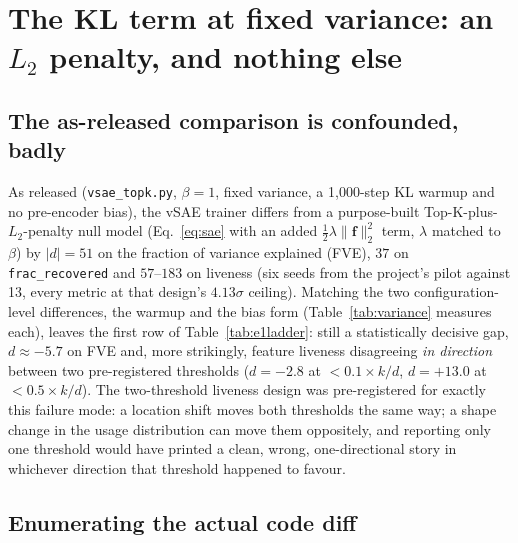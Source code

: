 \documentclass[11pt]{article}
\begin{document}
\section{The KL term at fixed variance: an $L_2$ penalty, and nothing else}
\label{sec:e1}

\subsection{The as-released comparison is confounded, badly}

As released (\texttt{vsae\_topk.py}, $\beta=1$, fixed variance, a 1{,}000-step
KL warmup and no pre-encoder bias), the vSAE trainer differs from a
purpose-built Top-K-plus-$L_2$-penalty null model (Eq.~\ref{eq:sae} with an
added $\tfrac{1}{2}\lambda\|\mathbf{f}\|_2^2$ term, $\lambda$ matched to
$\beta$) by $|d|=51$ on the fraction of variance explained (FVE), $37$ on
\texttt{frac\_recovered} and $57$--$183$ on liveness (six seeds from the
project's pilot against 13, every metric at that design's $4.13\sigma$
ceiling). Matching the two configuration-level differences, the warmup and
the bias form (Table~\ref{tab:variance} measures each), leaves the first row
of Table~\ref{tab:e1ladder}: still a statistically decisive gap,
$d\approx -5.7$ on FVE and, more strikingly, feature liveness disagreeing
\emph{in direction} between two pre-registered thresholds
($d=-2.8$ at $<0.1\times k/d$, $d=+13.0$ at $<0.5\times k/d$). The
two-threshold liveness design was pre-registered for exactly this failure
mode: a location shift moves both thresholds the same way; a shape change in
the usage distribution can move them oppositely, and reporting only one
threshold would have printed a clean, wrong, one-directional story in
whichever direction that threshold happened to favour.

\subsection{Enumerating the actual code diff}
\end{document}
